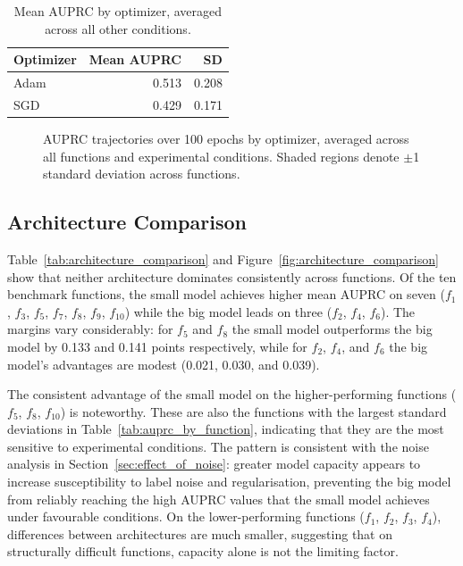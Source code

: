 \documentclass{article}
\begin{document}
\begin{table}[htbp]
\centering
\caption{Mean AUPRC by optimizer, averaged across all other conditions.}
\label{tab:auprc_by_optimizer}
\begin{tabular}{lrr}
\toprule
Optimizer & Mean AUPRC & SD \\
\midrule
Adam & 0.513 & 0.208 \\
SGD  & 0.429 & 0.171 \\
\bottomrule
\end{tabular}
\end{table}


\begin{figure}[htbp]
    \centering
    
    \caption{AUPRC trajectories over 100 epochs by optimizer,
    averaged across all functions and experimental conditions. Shaded regions
    denote $\pm$1 standard deviation across functions.}
    \label{fig:auprc_by_optimizer}
\end{figure}

\FloatBarrier

\subsection{Architecture Comparison}
\label{sec:arch_comparison}

Table~\ref{tab:architecture_comparison} and Figure~\ref{fig:architecture_comparison}
show that neither architecture dominates consistently across functions. Of the ten
benchmark functions, the small model achieves higher mean AUPRC on seven ($f_1$,
$f_3$, $f_5$, $f_7$, $f_8$, $f_9$, $f_{10}$) while the big model leads on three
($f_2$, $f_4$, $f_6$). The margins vary considerably: for $f_5$ and $f_8$ the
small model outperforms the big model by 0.133 and 0.141 points respectively,
while for $f_2$, $f_4$, and $f_6$ the big model's advantages are modest (0.021,
0.030, and 0.039).

The consistent advantage of the small model on the higher-performing functions
($f_5$, $f_8$, $f_{10}$) is noteworthy. These are also the functions with the
largest standard deviations in Table~\ref{tab:auprc_by_function}, indicating that
they are the most sensitive to experimental conditions. The pattern is consistent
with the noise analysis in Section~\ref{sec:effect_of_noise}: greater model capacity
appears to increase susceptibility to label noise and regularisation, preventing
the big model from reliably reaching the high AUPRC values that the small model
achieves under favourable conditions. On the lower-performing functions ($f_1$,
$f_2$, $f_3$, $f_4$), differences between architectures are much smaller, suggesting that on structurally difficult functions, capacity alone is not
the limiting factor.
\end{document}
